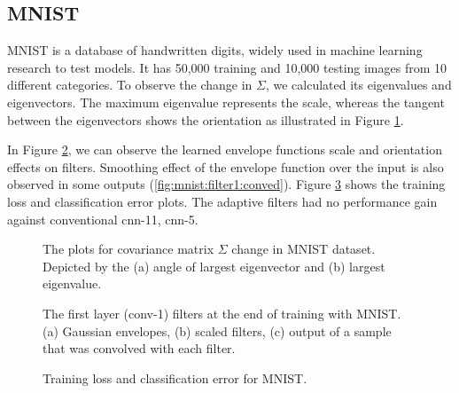 \documentclass{bmvc2k}
\begin{document}
\subsection{MNIST}

MNIST \cite{mnist} is a database of handwritten digits, widely used in machine learning research to test models. It has 50,000 training and 10,000 testing images from 10 different categories. To observe the change in $\Sigma$, we calculated its eigenvalues and eigenvectors. The maximum eigenvalue represents the scale, whereas the tangent between the eigenvectors shows the orientation as illustrated in Figure \ref{fig:mnist:convchange}. 

In Figure \ref{fig:mnistfilt1}, we can observe the learned envelope functions scale and orientation effects on filters. Smoothing effect of the envelope function over the input is also observed in some outputs (\ref{fig:mnist:filter1:conved}).
Figure \ref{fig:mnistplot} shows the training loss and classification error plots. The adaptive filters had no performance gain against conventional cnn-11, cnn-5. 


\begin{figure}
	\centering
	\caption{The plots for covariance matrix $\Sigma$ change in MNIST dataset. Depicted by the (a) angle of largest eigenvector and (b) largest eigenvalue.}
	\label{fig:mnist:convchange}
\end{figure}

\begin{figure}
	\centering
	\caption{The first layer (conv-1) filters at the end of training with MNIST. (a) Gaussian envelopes, (b) scaled filters, (c) output of a sample that was convolved with each filter.}
	\label{fig:mnistfilt1}
\end{figure}

\begin{figure}
	\centering 
	\caption{Training loss and classification error for MNIST.}
	\label{fig:mnistplot}
\end{figure}
\end{document}
